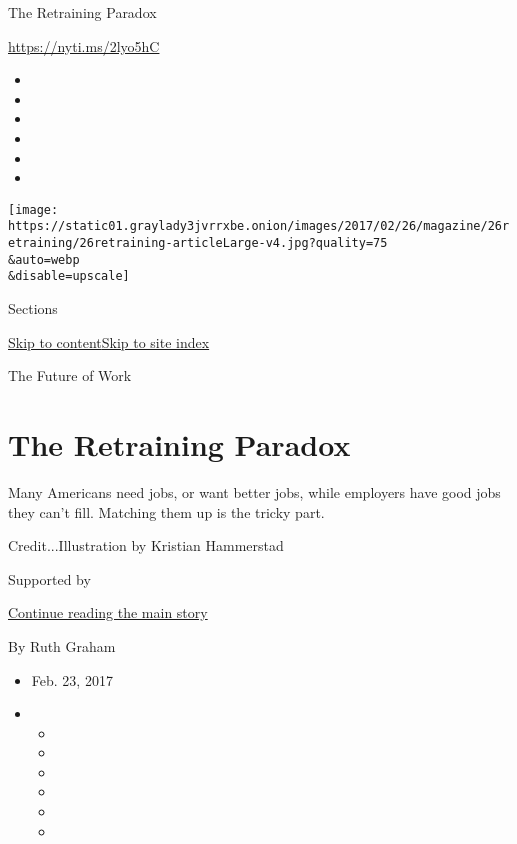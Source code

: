 The Retraining Paradox

\url{https://nyti.ms/2lyo5hC}

\begin{itemize}
\item
\item
\item
\item
\item
\item
\end{itemize}

\texttt{[image: https://static01.graylady3jvrrxbe.onion/images/2017/02/26/magazine/26retraining/26retraining-articleLarge-v4.jpg?quality=75\\\&auto=webp\\\&disable=upscale]}

Sections

\protect\hyperlink{site-content}{Skip to
content}\protect\hyperlink{site-index}{Skip to site index}

The Future of Work

\hypertarget{the-retraining-paradox}{%
\section{The Retraining Paradox}\label{the-retraining-paradox}}

Many Americans need jobs, or want better jobs, while employers have good
jobs they can't fill. Matching them up is the tricky part.

Credit...Illustration by Kristian Hammerstad

Supported by

\protect\hyperlink{after-sponsor}{Continue reading the main story}

By Ruth Graham

\begin{itemize}
\item
  Feb. 23, 2017
\item
  \begin{itemize}
  \item
  \item
  \item
  \item
  \item
  \item
  \end{itemize}
\end{itemize}

